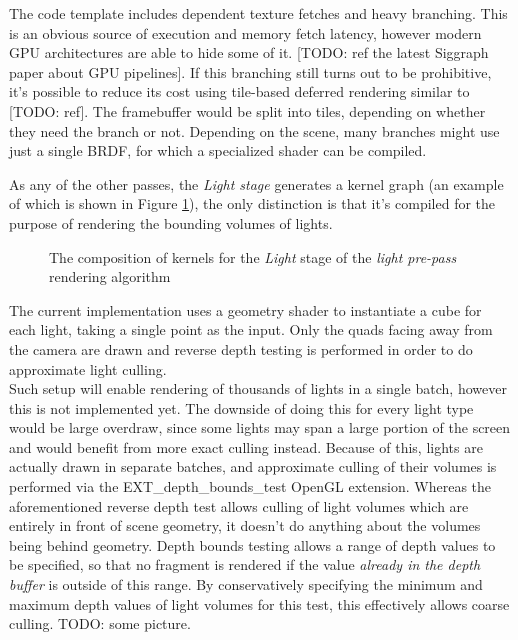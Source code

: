 The code template includes dependent texture fetches and heavy branching. This is an obvious source of execution and memory fetch latency, however modern GPU architectures are able to hide some of it. [TODO: ref the latest Siggraph paper about GPU pipelines].
If this branching still turns out to be prohibitive, it's possible to reduce its cost using tile-based deferred rendering similar to [TODO: ref]. The framebuffer would be split into tiles, depending on whether they need the branch or not. Depending on the scene, many branches might use just a single BRDF, for which a specialized shader can be compiled.

As any of the other passes, the \emph{Light stage} generates a kernel graph (an example of which is shown in Figure \ref{fig:DeferredLightingStage2}), the only distinction is that it's compiled for the purpose of rendering the bounding volumes of lights.

\begin{figure}[h!]
  \centering
    \caption[Light Pre-Pass Stage 2]{The composition of kernels for the \emph{Light} stage of the  \emph{light pre-pass} rendering algorithm}
  \label{fig:DeferredLightingStage2}
\end{figure}

The current implementation uses a geometry shader to instantiate a cube for each light, taking a single point as the input. Only the quads facing away from the camera are drawn and reverse depth testing is performed in order to do approximate light culling. \\
Such setup will enable rendering of thousands of lights in a single batch, however this is not implemented yet. The downside of doing this for every light type would be large overdraw, since some lights may span a large portion of the screen and would benefit from more exact culling instead. Because of this, lights are actually drawn in separate batches, and approximate culling of their volumes is performed via the EXT\_depth\_bounds\_test OpenGL extension. Whereas the aforementioned reverse depth test allows culling of light volumes which are entirely in front of scene geometry, it doesn't do anything about the volumes being behind geometry. Depth bounds testing allows a range of depth values to be specified, so that no fragment is rendered if the value \emph{already in the depth buffer} is outside of this range. By conservatively specifying the minimum and maximum depth values of light volumes for this test, this effectively allows coarse culling. TODO: some picture.

